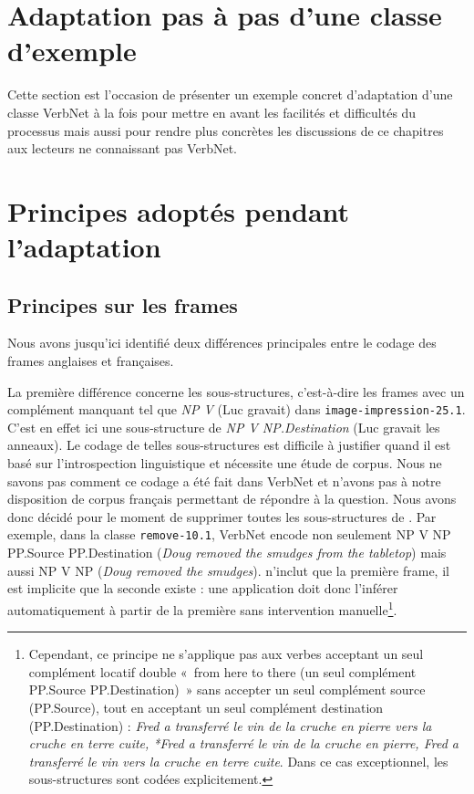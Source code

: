 \section{Adaptation pas à pas d'une classe d'exemple}

Cette section est l'occasion de présenter un exemple concret d'adaptation d'une
classe VerbNet à la fois pour mettre en avant les facilités et difficultés du
processus mais aussi pour rendre plus concrètes les discussions de ce chapitres
aux lecteurs ne connaissant pas VerbNet.

\section{Principes adoptés pendant l'adaptation}

\subsection{Principes sur les frames}\label{princp}

Nous avons jusqu'ici identifié deux différences principales entre le codage des
frames anglaises et françaises.

La première différence concerne les sous-structures, c'est-à-dire les frames
avec un complément manquant tel que \emph{NP V} (Luc gravait) dans
{\color{blue}\texttt{image-impression-25.1}}. C'est en effet ici une
sous-structure de \emph{NP V NP.Destination} (Luc gravait les anneaux). Le
codage de telles sous-structures est difficile à justifier quand il est basé
sur l'introspection linguistique et nécessite une étude de corpus. Nous ne
savons pas comment ce codage a été fait dans VerbNet et n'avons pas à notre
disposition de corpus français permettant de répondre à la question. Nous avons
donc décidé pour le moment de supprimer toutes les sous-structures de
\verbenet{}. Par exemple, dans la classe {\color{blue}\texttt{remove-10.1}},
VerbNet encode non seulement NP V NP PP.Source PP.Destination (\emph{Doug
removed the smudges from the tabletop}) mais aussi NP V NP (\emph{Doug removed
the smudges}). \verbenet{} n'inclut que la première frame, il est implicite que
la seconde existe : une application doit donc l'inférer automatiquement à
partir de la première sans intervention manuelle\footnote{Cependant, ce
    principe ne s'applique pas aux verbes acceptant un seul complément locatif
    double «~from here to there (un seul complément PP.Source PP.Destination)~»
    sans accepter un seul complément source (PP.Source), tout en acceptant un
    seul complément destination (PP.Destination) : \emph{Fred a transferré le
        vin de la cruche en pierre vers la cruche en terre cuite, *Fred a
        transferré le vin de la cruche en pierre, Fred a transferré le vin vers
        la cruche en terre cuite}. Dans ce cas exceptionnel, les
    sous-structures sont codées explicitement.}.

